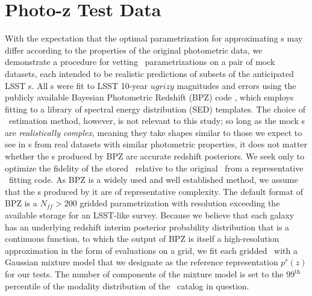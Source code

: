 \section{Photo-z Test Data}

With the expectation that the optimal parametrization for approximating \pz s 
may differ according to the properties of the original photometric data, we 
demonstrate a procedure for vetting \pz\ parametrizations on a pair of mock 
datasets, each intended to be realistic predictions of subsets of the 
anticipated LSST \pz s.
All \pz s were fit to LSST 10-year $ugrizy$ magnitudes and errors 
\citep{ivezic_lsst:_2008} using the publicly available Bayesian Photometric 
Redshift (BPZ) code \citep{benitez_bayesian_2000}, which employs fitting to a 
library of spectral energy distribution (SED) templates.
The choice of \pz\ estimation method, however, is not relevant to this study; 
so long as the mock \pz s are \textit{realistically complex}, meaning they take 
shapes similar to those we expect to see in \pz s from real datasets with 
similar photometric properties, it does not matter whether the \pz s produced 
by BPZ are accurate redshift posteriors.
We seek only to optimize the fidelity of the stored \pz\ relative to the 
original \pz\ from a representative \pz\ fitting code.
\citep[See][Schmidt, et al.\ in preparation for other work comparing the 
accuracy of \pz s produced by different methods.]{tanaka_photometric_2017, 
	de_jong_third_2017, amaro_metaphor:_2016}
As BPZ is a widely used and well established method, we assume that the \pz s 
produced by it are of representative complexity.
The default format of BPZ is a $N_{ff}>200$ gridded parametrization with 
resolution exceeding the available storage for an LSST-like survey.
Because we believe that each galaxy has an underlying redshift interim 
posterior probability distribution that is a continuous function, to which the 
output of BPZ is itself a high-resolution approximation in the form of 
evaluations on a grid, we fit each gridded \pz\ with a Gaussian mixture model 
that we designate as the reference representation $p^{r}(z)$ for our tests.
The number of components of the mixture model is set to the $99^{\mathrm{th}}$ 
percentile of the modality distribution of the \pz\ catalog in question.

